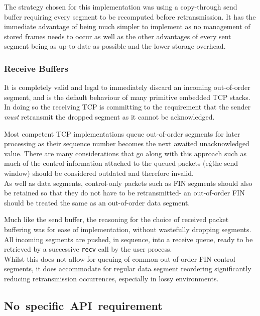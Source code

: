             The strategy chosen for this implementation was using a copy-through send buffer requiring every segment to be recomputed before retransmission. It has the immediate advantage of being much simpler to implement as no management of stored frames needs to occur as well as the other advantages of every sent segment being as up-to-date as possible and the lower storage overhead.

        \subsubsection{Receive Buffers}
            It is completely valid and legal to immediately discard an incoming out-of-order segment, and is the default behaviour of many primitive embedded TCP stacks. In doing so the receiving TCP is committing to the requirement that the sender \textit{must} retransmit the dropped segment as it cannot be acknowledged.

            Most competent TCP implementations queue out-of-order segments for later processing as their sequence number becomes the next awaited unacknowledged value. There are many considerations that go along with this approach such as much of the control information attached to the queued packets (e\.g\. the send window) should be considered outdated and therefore invalid. \\
            As well as data segments, control-only packets such as FIN segments should also be retained so that they do not have to be retransmitted- an out-of-order FIN should be treated the same as an out-of-order data segment.

            Much like the send buffer, the reasoning for the choice of received packet buffering was for ease of implementation, without wastefully dropping segments. All incoming segments are pushed, in sequence, into a receive queue, ready to be retrieved by a successive \texttt{recv} call by the user process. \\
            Whilst this does not allow for queuing of common out-of-order FIN control segments, it does accommodate for regular data segment reordering significantly reducing retransmission occurrences, especially in lossy environments.

    \subsection{\mbox{No specific API requirement}}
